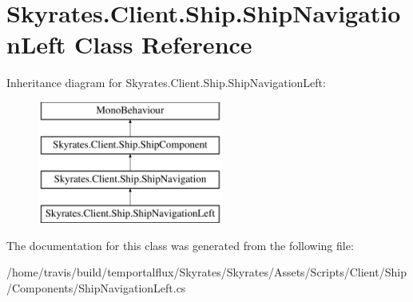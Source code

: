 \hypertarget{class_skyrates_1_1_client_1_1_ship_1_1_ship_navigation_left}{\section{Skyrates.\-Client.\-Ship.\-Ship\-Navigation\-Left Class Reference}
\label{class_skyrates_1_1_client_1_1_ship_1_1_ship_navigation_left}
}
Inheritance diagram for Skyrates.\-Client.\-Ship.\-Ship\-Navigation\-Left\-:\begin{figure}[H]
\begin{center}
\leavevmode
\includegraphics[height=4.000000cm]{class_skyrates_1_1_client_1_1_ship_1_1_ship_navigation_left}
\end{center}
\end{figure}


The documentation for this class was generated from the following file\-:\begin{DoxyCompactItemize}
\item 
/home/travis/build/temportalflux/\-Skyrates/\-Skyrates/\-Assets/\-Scripts/\-Client/\-Ship/\-Components/Ship\-Navigation\-Left.\-cs\end{DoxyCompactItemize}
